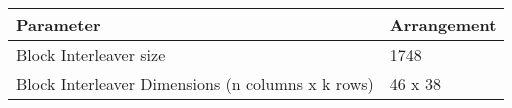 \begin{tabular}{|l|l|}
\hline
\textbf{Parameter} & \textbf{Arrangement} \\
\hline
Block Interleaver size & 1748 \\
\hline
Block Interleaver Dimensions (n columns x k rows) & 46 x 38 \\
\hline
\end{tabular}